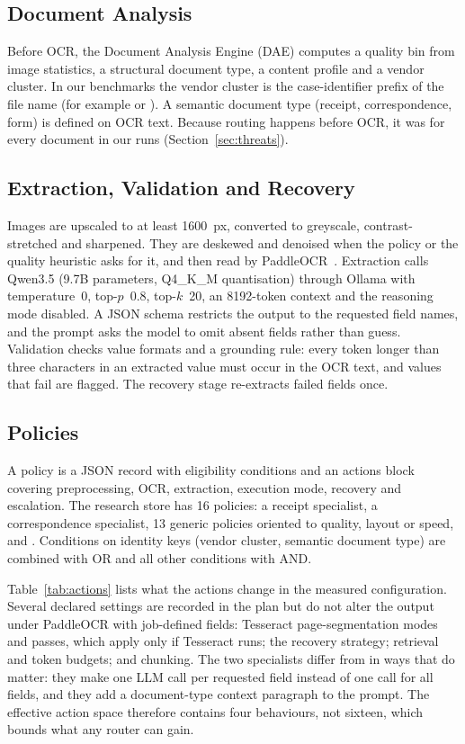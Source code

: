 \documentclass[conference,a4paper]{IEEEtran}
\newcommand{\pol}[1]{\texttt{\detokenize{#1}}}
\begin{document}
\subsection{Document Analysis}
Before OCR, the Document Analysis Engine (DAE) computes a quality bin from image statistics, a structural document type, a content profile and a vendor cluster. In our benchmarks the vendor cluster is the case-identifier prefix of the file name (for example \pol{cord_} or \pol{funsd_}). A semantic document type (receipt, correspondence, form) is defined on OCR text. Because routing happens before OCR, it was \pol{unknown} for every document in our runs (Section~\ref{sec:threats}).

\subsection{Extraction, Validation and Recovery}
Images are upscaled to at least 1600~px, converted to greyscale, contrast-stretched and sharpened. They are deskewed and denoised when the policy or the quality heuristic asks for it, and then read by PaddleOCR~\cite{ppocr}. Extraction calls Qwen3.5 (9.7B parameters, Q4\_K\_M quantisation) through Ollama with temperature~0, top-$p$~0.8, top-$k$~20, an 8192-token context and the reasoning mode disabled. A JSON schema restricts the output to the requested field names, and the prompt asks the model to omit absent fields rather than guess. Validation checks value formats and a grounding rule: every token longer than three characters in an extracted value must occur in the OCR text, and values that fail are flagged. The recovery stage re-extracts failed fields once.

\subsection{Policies}
A policy is a JSON record with eligibility conditions and an actions block covering preprocessing, OCR, extraction, execution mode, recovery and escalation. The research store has 16 policies: a receipt specialist, a correspondence specialist, 13 generic policies oriented to quality, layout or speed, and \pol{default}. Conditions on identity keys (vendor cluster, semantic document type) are combined with OR and all other conditions with AND.

Table~\ref{tab:actions} lists what the actions change in the measured configuration. Several declared settings are recorded in the plan but do not alter the output under PaddleOCR with job-defined fields: Tesseract page-segmentation modes and passes, which apply only if Tesseract runs; the recovery strategy; retrieval and token budgets; and chunking. The two specialists differ from \pol{default} in ways that do matter: they make one LLM call per requested field instead of one call for all fields, and they add a document-type context paragraph to the prompt. The effective action space therefore contains four behaviours, not sixteen, which bounds what any router can gain.
\end{document}
